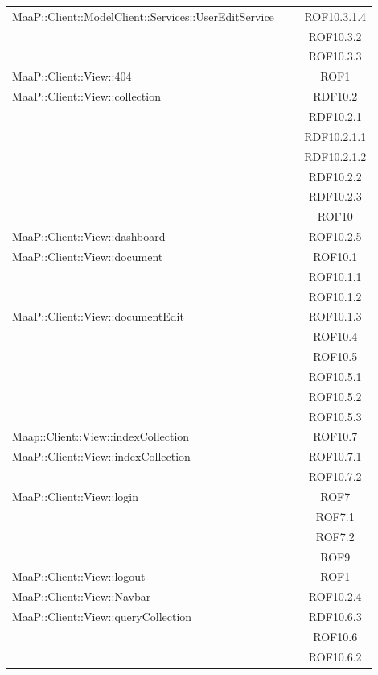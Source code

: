 \begin{center}
\begin{longtable}{|p{0.8\linewidth}|c|}
\midrule
MaaP::Client::ModelClient::Services::UserEditService
& ROF10.3.1.4\\
& ROF10.3.2\\
& ROF10.3.3\\

\midrule
MaaP::Client::View::404
& ROF1\\

\midrule
MaaP::Client::View::collection
& RDF10.2\\
& RDF10.2.1\\
& RDF10.2.1.1\\
& RDF10.2.1.2\\
& RDF10.2.2\\
& RDF10.2.3\\
& ROF10\\

\midrule
MaaP::Client::View::dashboard
& ROF10.2.5\\

\midrule
MaaP::Client::View::document
& ROF10.1\\
& ROF10.1.1\\
& ROF10.1.2\\

\midrule
MaaP::Client::View::documentEdit
& ROF10.1.3\\
& ROF10.4\\
& ROF10.5\\
& ROF10.5.1\\
& ROF10.5.2\\
& ROF10.5.3\\

\midrule
Maap::Client::View::indexCollection
& ROF10.7\\

\midrule
MaaP::Client::View::indexCollection
& ROF10.7.1\\
& ROF10.7.2\\

\midrule
MaaP::Client::View::login
& ROF7\\
& ROF7.1\\
& ROF7.2\\
& ROF9\\

\midrule
MaaP::Client::View::logout
& ROF1\\

\midrule
MaaP::Client::View::Navbar
& ROF10.2.4\\

\midrule
MaaP::Client::View::queryCollection
& RDF10.6.3\\
& ROF10.6\\
& ROF10.6.2\\


\end{longtable}
\end{center}
